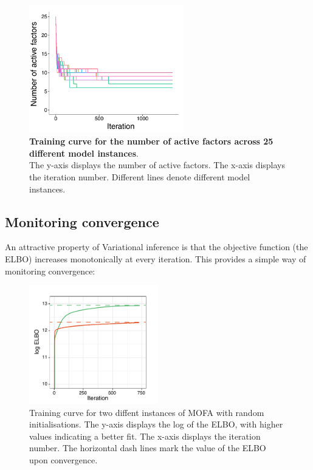 \begin{figure}[H]
	\centering 	
	\includegraphics[width=0.6\textwidth]{MOFA_nfactors}
	\caption{\textbf{Training curve for the number of active factors across 25 different model instances}.\\
	The y-axis displays the number of active factors. The x-axis displays the iteration number. Different lines denote different model instances.}
	\label{fig:mofa_nfactors}
\end{figure}


\subsection{Monitoring convergence}

An attractive property of Variational inference is that the objective function (the ELBO) increases monotonically at every iteration. This provides a simple way of monitoring convergence:
\begin{figure}[H]
	\centering 	
	\includegraphics[width=0.5\textwidth]{elbo_convergence}
	\caption{Training curve for two diffent instances of MOFA with random initialisations. The y-axis displays the log of the ELBO, with higher values indicating a better fit. The x-axis displays the iteration number. The horizontal dash lines mark the value of the ELBO upon convergence. }
	\label{fig:elbo_convergence}
\end{figure}

